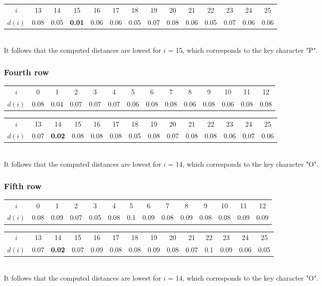\documentclass[11pt]{report}
\begin{document}
\begin{tabular}{| c | c c c c c c c c c c c c c |}
\hline
$i$ & 13 & 14 & 15 & 16 & 17 & 18 & 19 & 20 & 21 & 22 & 23 & 24 & 25\\
$d(i)$ & 0.08
& 0.05
& \textbf{0.01}
& 0.06
& 0.06
& 0.05
& 0.07
& 0.08
& 0.06
& 0.05
& 0.07
& 0.06
& 0.06\\
\hline
\end{tabular}
${}$\\
It follows that the computed distances are lowest for $i$ = 15, which corresponds to the key
character "P".

\subsubsection{Fourth row}
\begin{tabular}{| c | c c c c c c c c c c c c c |}
\hline
$i$ & 0 & 1 & 2 & 3 & 4 & 5 & 6 & 7 & 8 & 9 & 10 & 11 & 12\\
$d(i)$ & 0.08
& 0.04
& 0.07
& 0.07
& 0.07
& 0.06
& 0.08
& 0.08
& 0.06
& 0.08
& 0.06
& 0.08
& 0.08 \\
\hline
\end{tabular}

\begin{tabular}{| c | c c c c c c c c c c c c c |}
\hline
$i$ & 13 & 14 & 15 & 16 & 17 & 18 & 19 & 20 & 21 & 22 & 23 & 24 & 25\\
$d(i)$ & 0.07
& \textbf{0.02}
& 0.08
& 0.08
& 0.08
& 0.05
& 0.08
& 0.07
& 0.08
& 0.08
& 0.06
& 0.07
& 0.06\\
\hline
\end{tabular}
${}$\\
It follows that the computed distances are lowest for $i$ = 14, which corresponds to the key
character "O".

\subsubsection{Fifth row}
\begin{tabular}{| c | c c c c c c c c c c c c c |}
\hline
$i$ & 0 & 1 & 2 & 3 & 4 & 5 & 6 & 7 & 8 & 9 & 10 & 11 & 12\\
$d(i)$ & 0.08
& 0.09
& 0.07
& 0.05
& 0.08
& 0.1
& 0.09
& 0.08
& 0.09
& 0.08
& 0.08
& 0.09
& 0.09\\
\hline
\end{tabular}
\begin{tabular}{| c | c c c c c c c c c c c c c |}
\hline
$i$ & 13 & 14 & 15 & 16 & 17 & 18 & 19 & 20 & 21 & 22 & 23 & 24 & 25\\
$d(i)$ & 0.07
& \textbf{0.02}
& 0.07
& 0.09
& 0.08
& 0.08
& 0.09
& 0.08
& 0.07
& 0.1
& 0.09
& 0.06
& 0.05\\
\hline
\end{tabular}
${}$\\
It follows that the computed distances are lowest for $i$ = 14, which corresponds to the key
character "O".
\end{document}
